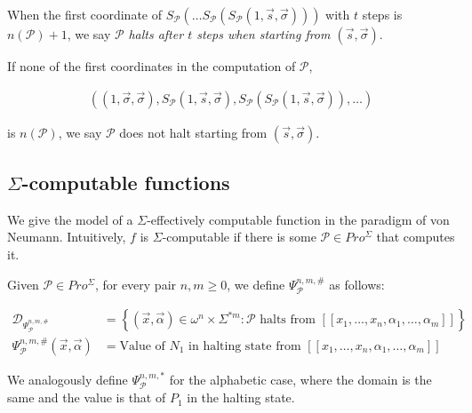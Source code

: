 \documentclass[a4paper, 12pt]{article}
\begin{document}
When the first coordinate of  $S_{\mathcal{P}} \left( \ldots S_{\mathcal{P}}
\left( S_{\mathcal{P}}\left( 1, \overrightarrow{s}, \overrightarrow{\sigma}
\right)\right)  \right) $ with $t$ steps is $n(\mathcal{P}) + 1$, we say
$\mathcal{P}$ \textit{halts after $t$ steps when starting from
$(\overrightarrow{s}, \overrightarrow{\sigma})$}.

If none of the first coordinates in the computation of $\mathcal{P}$, 

\begin{align*}
    \left(  (1, \overrightarrow{\sigma}, \overrightarrow{\sigma}),
    S_{\mathcal{P}}\left( 1, \overrightarrow{s}, \overrightarrow{\sigma}
\right), S_{\mathcal{P}} \left( S_{\mathcal{P}} \left( 1, \overrightarrow{s},
\overrightarrow{\sigma} \right)  \right), \ldots   \right) 
\end{align*}

is $n(\mathcal{P})$, we say $\mathcal{P}$ does not halt starting from
$(\overrightarrow{s}, \overrightarrow{\sigma})$.

\subsection{$\Sigma$-computable functions}

We give the model of a $\Sigma$-effectively computable function in the paradigm
of von Neumann. Intuitively, $f$ is $\Sigma$-computable if there is some
$\mathcal{P} \in Pro^{\Sigma}$ that computes it. 

Given $\mathcal{P} \in Pro^{\Sigma}$, for every pair $n,m \geq 0$, we define
$\Psi_{\mathcal{P}}^{n, m, \#}$ as follows: 

\begin{align*}
    \mathcal{D}_{\Psi_{\mathcal{P}}^{n, m, \#}} &= \left\{ (\overrightarrow{x},
    \overrightarrow{\alpha}) \in \omega^n \times \Sigma^{*m} : \mathcal{P}
\text{ halts from } [\![ x_1,\ldots, x_n, \alpha_1, \ldots,
\alpha_m ]\!] \right\}  \\ 
        \Psi_{\mathcal{P}}^{n, m, \#}(\overrightarrow{x}, \overrightarrow{\alpha}) &=
    \text{Value of } N_1 \text{ in halting state from } [\![ x_1,\ldots, x_n,
    \alpha_1, \ldots, \alpha_m ]\!]
\end{align*}

We analogously define $\Psi_{\mathcal{P}}^{n, m, *}$ for the alphabetic case,
where the domain is the same and the value is that of $P_1$ in the halting
state.

~ 
\end{document}
